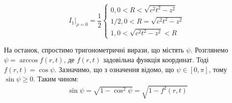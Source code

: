 %
\begin{equation}
\left. I_1 \right|_{\rho = 0} = \frac{1}{2} \begin{cases}
0, 0 < R < \sqrt{c^2t^2 - z^2} \\
1/2, 0 < R = \sqrt{c^2t^2 - z^2} \\ 
1, 0 < \sqrt{c^2t^2 - z^2} < R 
\end{cases}
\end{equation}

На останок, спростимо тригонометричні вирази, що містять $ \psi $. Розглянемо 
$ \psi = \arccos f(r,t) $, де $ f(r,t) $ задовільна функція координат. 
Тоді $ f(r,t) = \cos \psi $. Зазначимо, що з означення відомо, що 
$ \psi \in \left[ 0, \pi \right] $, тому $ \sin \psi \geq 0 $. Таким чином:
%
\begin{equation*} \begin{aligned}
\sin \psi = \sqrt{1 - \cos^2 \psi } = \sqrt{1 - f^2(r,t)}
\end{aligned} \end{equation*}

